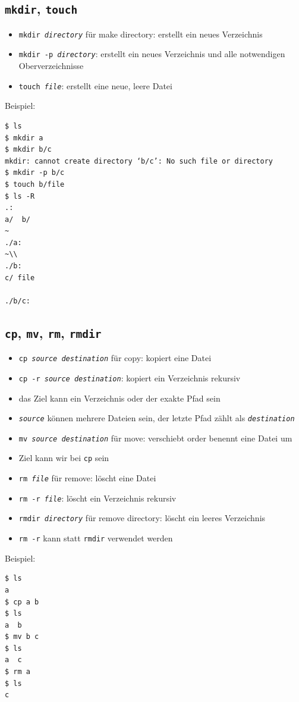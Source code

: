 \subsection{\texttt{mkdir}, \texttt{touch}}
\begin{itemize}
  \item \texttt{mkdir \textit{directory}} für make directory: erstellt ein neues Verzeichnis
  \item \texttt{mkdir -p \textit{directory}}: erstellt ein neues Verzeichnis und alle notwendigen Oberverzeichnisse
  \item \texttt{touch \textit{file}}: erstellt eine neue, leere Datei
\end{itemize}
Beispiel:
\begin{verbatim}
$ ls
$ mkdir a
$ mkdir b/c
mkdir: cannot create directory ‘b/c’: No such file or directory
$ mkdir -p b/c
$ touch b/file
$ ls -R
.:
a/  b/
~
./a:
~\\                  
./b:
c/ file

./b/c:
\end{verbatim}

\subsection{\texttt{cp}, \texttt{mv}, \texttt{rm}, \texttt{rmdir}}
\begin{itemize}
  \item \texttt{cp \textit{source} \textit{destination}} für copy: kopiert eine Datei
  \item \texttt{cp -r \textit{source} \textit{destination}}: kopiert ein Verzeichnis rekursiv
  \item das Ziel kann ein Verzeichnis oder der exakte Pfad sein
  \item \texttt{\textit{source}} können mehrere Dateien sein, der letzte Pfad zählt als \texttt{\textit{destination}}
  \item \texttt{mv \textit{source} \textit{destination}} für move: verschiebt order benennt eine Datei um
  \item Ziel kann wir bei \texttt{cp} sein
  \item \texttt{rm \textit{file}} für remove: löscht eine Datei
  \item \texttt{rm -r \textit{file}}: löscht ein Verzeichnis rekursiv
  \item \texttt{rmdir \textit{directory}} für remove directory: löscht ein leeres Verzeichnis
  \item \texttt{rm -r} kann statt \texttt{rmdir} verwendet werden
\end{itemize}
Beispiel:
\begin{verbatim}
$ ls
a
$ cp a b
$ ls
a  b
$ mv b c
$ ls
a  c
$ rm a
$ ls
c
\end{verbatim}


